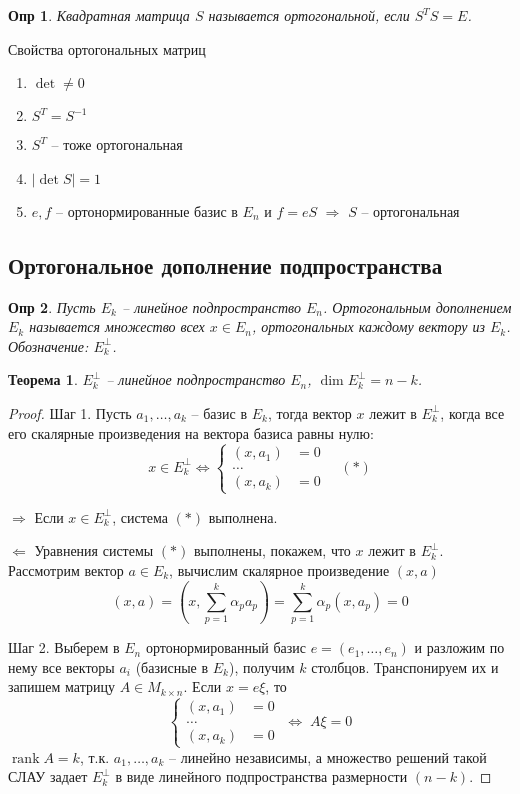 \documentclass[a4paper,12pt]{article}
\DeclareMathOperator{\rank}{\mathop{rank}}
\newtheorem*{definition}{Опр}
\newtheorem{theorem}{Теорема}[section]
\begin{document}
\begin{definition}
	Квадратная матрица $S$ называется ортогональной, если $S^T S = E$.
\end{definition}

Свойства ортогональных матриц
\begin{enumerate}
	\item $\det \ne 0$
	\item $S^T = S^{-1}$
	\item $S^T$ -- тоже ортогональная
	\item $|\det S| = 1$
	\item $e, f$ -- ортонормированные базис в $E_n$ и $f = eS$ $\Rightarrow$ $S$ -- ортогональная
\end{enumerate}

\subsection{Ортогональное дополнение подпространства}

\begin{definition}
	Пусть $E_k$ -- линейное подпространство $E_n$. Ортогональным дополнением $E_k$ называется множество всех $x \in E_n$, ортогональных каждому вектору из $E_k$. Обозначение: $E_k^{\perp}$.
\end{definition}

\begin{theorem}
	$E_k^{\perp}$ -- линейное подпространство $E_n$, $\dim E_k^{\perp} = n - k$.
\end{theorem}
\begin{proof}
	Шаг 1. Пусть $a_1, \ldots, a_k$ -- базис в $E_k$, тогда вектор $x$ лежит в $E_k^{\perp}$, когда все его скалярные произведения на вектора базиса равны нулю:
	\[
		x \in E_k^{\perp} \Leftrightarrow 
		\left\{
			\begin{aligned}
				(x, a_1) &= 0\\
				\ldots  \\				
				(x, a_k) &= 0
			\end{aligned} 
		\right. \quad (*)
	\]
	
	$\Rightarrow$ Если $x \in E_k^{\perp}$, система $(*)$ выполнена.	
	
	$\Leftarrow$ Уравнения системы $(*)$ выполнены, покажем, что $x$ лежит в $E_k^{\perp}$. Рассмотрим вектор $a \in E_k$, вычислим скалярное произведение $(x,a)$
	\[
		(x, a) = \left(x, \sum_{p=1}^{k}\alpha_p a_p \right) = \sum_{p=1}^{k} \alpha_p (x, a_p) = 0
	\]
	
	Шаг 2. Выберем в $E_n$ ортонормированный базис $e = (e_1, \ldots, e_n)$ и разложим по нему все векторы $a_i$ (базисные в $E_k$), получим $k$ столбцов. Транспонируем их и запишем матрицу $A \in M_{k \times n}$. Если $x = e \xi$, то 
	\[
		\left\{
			\begin{aligned}
				(x, a_1) &= 0\\
				\ldots  \\				
				(x, a_k) &= 0
			\end{aligned} 
		\right. \; \Leftrightarrow \; A\xi = 0
	\]
	$\rank A = k$, т.к. $a_1, \ldots, a_k$ -- линейно независимы, а множество решений такой СЛАУ задает $E_k^{\perp}$ в виде линейного подпространства размерности $(n-k)$.
\end{proof}
\end{document}
